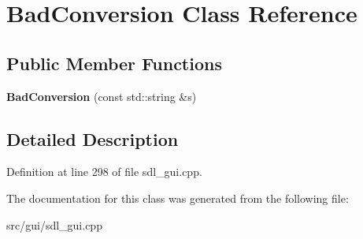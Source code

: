 \hypertarget{classBadConversion}{\section{Bad\-Conversion Class Reference}
\label{classBadConversion}
}
\subsection*{Public Member Functions}
\begin{DoxyCompactItemize}
\item 
\hypertarget{classBadConversion_acf304d65e2a3f8a7ff2aa489ca3f28d6}{{\bfseries Bad\-Conversion} (const std\-::string \&s)}\label{classBadConversion_acf304d65e2a3f8a7ff2aa489ca3f28d6}

\end{DoxyCompactItemize}


\subsection{Detailed Description}


Definition at line 298 of file sdl\-\_\-gui.\-cpp.



The documentation for this class was generated from the following file\-:\begin{DoxyCompactItemize}
\item 
src/gui/sdl\-\_\-gui.\-cpp\end{DoxyCompactItemize}
